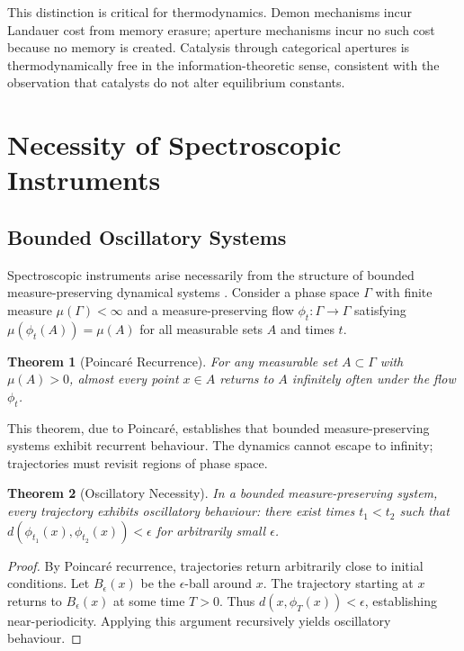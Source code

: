 \documentclass[twocolumn,10pt,a4paper]{article}
\newtheorem{theorem}{Theorem}[section]
\theoremstyle{definition}
\theoremstyle{remark}
\begin{document}
This distinction is critical for thermodynamics. Demon mechanisms incur Landauer cost from memory erasure; aperture mechanisms incur no such cost because no memory is created. Catalysis through categorical apertures is thermodynamically free in the information-theoretic sense, consistent with the observation that catalysts do not alter equilibrium constants.

\section{Necessity of Spectroscopic Instruments}
\label{sec:instruments}

\subsection{Bounded Oscillatory Systems}

Spectroscopic instruments arise necessarily from the structure of bounded measure-preserving dynamical systems \citep{sachikonye2024instruments}. Consider a phase space $\Gamma$ with finite measure $\mu(\Gamma) < \infty$ and a measure-preserving flow $\phi_t: \Gamma \to \Gamma$ satisfying $\mu(\phi_t(A)) = \mu(A)$ for all measurable sets $A$ and times $t$.

\begin{theorem}[Poincaré Recurrence]
\label{thm:poincare}
For any measurable set $A \subset \Gamma$ with $\mu(A) > 0$, almost every point $x \in A$ returns to $A$ infinitely often under the flow $\phi_t$.
\end{theorem}

This theorem, due to Poincaré, establishes that bounded measure-preserving systems exhibit recurrent behaviour. The dynamics cannot escape to infinity; trajectories must revisit regions of phase space.

\begin{theorem}[Oscillatory Necessity]
\label{thm:oscillatory}
In a bounded measure-preserving system, every trajectory exhibits oscillatory behaviour: there exist times $t_1 < t_2$ such that $d(\phi_{t_1}(x), \phi_{t_2}(x)) < \epsilon$ for arbitrarily small $\epsilon$.
\end{theorem}

\begin{proof}
By Poincaré recurrence, trajectories return arbitrarily close to initial conditions. Let $B_\epsilon(x)$ be the $\epsilon$-ball around $x$. The trajectory starting at $x$ returns to $B_\epsilon(x)$ at some time $T > 0$. Thus $d(x, \phi_T(x)) < \epsilon$, establishing near-periodicity. Applying this argument recursively yields oscillatory behaviour.
\end{proof}
\end{document}
